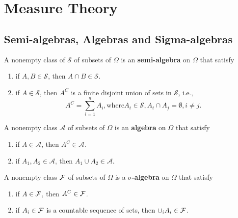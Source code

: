 \chapter{Measure Theory}

\section{Semi-algebras, Algebras and Sigma-algebras}

\begin{definition}
	A nonempty class of $\mathcal{S}$ of subsets of $\Omega$ is an \textbf{semi-algebra} on $\Omega$ that satisfy
	\begin{enumerate}
		\item if $A,B\in\mathcal{S}$, then $A\cap B\in\mathcal{S}$.
		\item if $A\in\mathcal{S}$, then $A^C$ is a finite disjoint union of sets in $\mathcal{S}$, i.e., $$A^C=\sum_{i=1}^{n}A_i, \text{where} A_i\in\mathcal{S}, A_i\cap A_j=\emptyset ,i\neq j.$$
	\end{enumerate}
\end{definition}

\begin{definition}[Algebra]
	A nonempty class $\mathcal{A}$ of subsets of $\Omega$ is an \textbf{algebra} on $\Omega$ that satisfy
	\begin{enumerate}
		\item if $A\in\mathcal{A}$, then $A^C\in\mathcal{A}$.
		\item if $A_1, A_2\in\mathcal{A}$, then $A_1\cup A_2\in\mathcal{A}$.
	\end{enumerate}
\end{definition}



\begin{definition}
	A nonempty class ${\mathcal F}$ of subsets of $\Omega$ is a \textbf{$\sigma$-algebra} on $\Omega$ that satisfy
	\begin{enumerate}
		\item if $A\in{\mathcal F}$, then $A^C\in{\mathcal F}$.
		\item if $A_i\in{\mathcal F}$ is a countable sequence of sets, then $\cup_iA_i\in{\mathcal F}$.
	\end{enumerate}
\end{definition}

